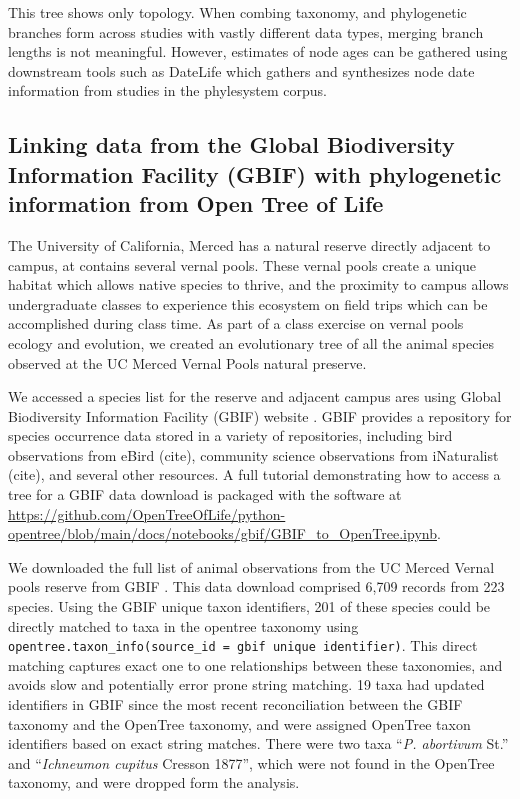 \documentclass[oupdraft]{sysbio_sse}
\begin{document}
This tree shows only topology. When combing taxonomy, and phylogenetic branches form across studies with vastly different data types, merging branch lengths is not meaningful. However, estimates of node ages can be gathered using downstream tools such as DateLife \citep{sanchez-reyes_datelife_2019} which gathers and synthesizes node date information from studies  in the phylesystem corpus.

\subsection{Linking data from the Global Biodiversity Information Facility (GBIF) with phylogenetic information from Open Tree of Life}

\bigskip


The University of California, Merced has a natural reserve directly adjacent to campus, at contains several vernal pools. These vernal pools create a unique habitat which allows native species to thrive, and the proximity to campus allows undergraduate classes to experience this ecosystem on field trips which can be accomplished during class time. As part of a class exercise on vernal pools ecology and evolution, we created an evolutionary tree of all the animal species observed at the UC Merced Vernal Pools natural preserve. 

We accessed a species list for the reserve and adjacent campus ares using Global Biodiversity Information Facility (GBIF) website \citep{global_biodiversity_information_facility_gbif_2019}. GBIF provides a repository for species occurrence data stored in a variety of repositories, including bird observations from eBird (cite), community science observations from iNaturalist (cite), and several other resources. A full tutorial demonstrating how to access a tree for a GBIF data download is packaged with the software at \url{https://github.com/OpenTreeOfLife/python-opentree/blob/main/docs/notebooks/gbif/GBIF_to_OpenTree.ipynb}.


We downloaded the full list of animal observations from the UC Merced Vernal pools reserve from GBIF \citep{global_biodiversity_information_facility_gbif_2019}. This data download comprised 6,709 records from 223 species. Using the GBIF unique taxon identifiers, 201 of these species could be directly matched to taxa in the opentree taxonomy using \texttt{opentree.taxon\_info(source\_id = {gbif unique identifier})}. This direct matching captures exact one to one relationships between these taxonomies, and avoids slow and potentially error prone string matching. 19 taxa had updated identifiers in GBIF since the most recent reconciliation between the GBIF taxonomy and the OpenTree taxonomy, and were assigned OpenTree taxon identifiers based on exact string matches. There were two taxa ``\textit{P. abortivum} St.'' and ``\textit{Ichneumon cupitus} Cresson 1877'', which were not found in the OpenTree taxonomy, and were dropped form the analysis.
 
\end{document}
